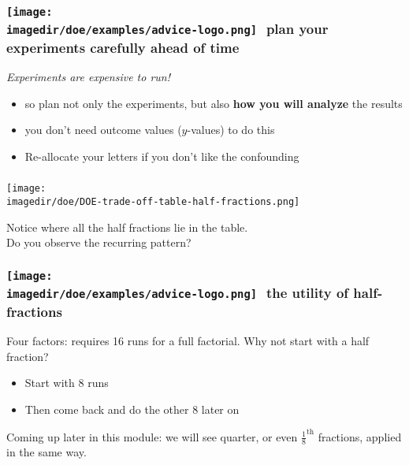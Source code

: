 \documentclass[handout,11pt,aspectratio=169,mathserif]{beamer}
\begin{document}
\begin{frame}\frametitle{\texttt{[image: \\imagedir/doe/examples/advice-logo.png]}\,\, plan your experiments carefully ahead of time}
	
	\vspace{24pt}
	{\color{myOrange} 	\emph{Experiments are expensive to run!}}
	

	\begin{exampleblock}{}
		\vspace{12pt}
		\begin{itemize}
			\item	so plan not only the experiments, but also \textbf{how you will analyze} the results
			\item	you don't need outcome values ($y$-values) to do this
			
			\vspace{1cm}

			\item	Re-allocate your letters if you don't like the confounding
		\end{itemize} 
	\end{exampleblock}
	
\end{frame}

\begin{frame}\frametitle{}
	\texttt{[image: \\imagedir/doe/DOE-trade-off-table-half-fractions.png]}
	
	\vspace{-10pt}
	Notice where all the half fractions lie in the table. \\
	Do you observe the recurring pattern?
\end{frame}

\begin{frame}\frametitle{\texttt{[image: \\imagedir/doe/examples/advice-logo.png]}\,\, the utility of half-fractions}
	
	\vspace{24pt}
	Four factors: requires 16 runs for a full factorial. Why not start with a half fraction?
	
	\vspace{24pt}
	\begin{itemize}
		\item	Start with 8 runs
		\item	Then come back and do the other 8 later on
	\end{itemize}
	
	\pause
	\vspace{24pt}
	{\color{myOrange} Coming up later in this module: we will see quarter, or even $\tfrac{1}{8}^\text{th}$ fractions, applied in the same way.}
	
\end{frame}
\end{document}
